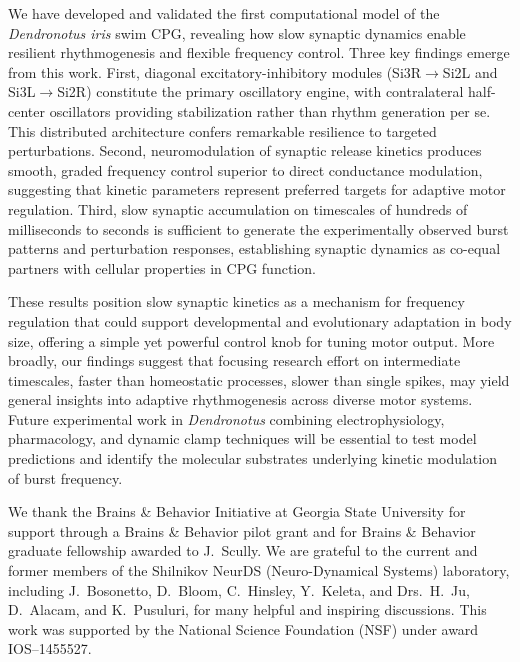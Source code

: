 \documentclass[nofootinbib,aip,amsmath,amssymb,preprint,twocolumn,floatfix,10pt]{revtex4-2}
\begin{document}
We have developed and validated the first computational model of the \textit{Dendronotus iris} swim CPG, revealing how slow synaptic dynamics enable resilient rhythmogenesis and flexible frequency control. Three key findings emerge from this work. First, diagonal excitatory-inhibitory modules (Si3R$\to$Si2L and Si3L$\to$Si2R) constitute the primary oscillatory engine, with contralateral half-center oscillators providing stabilization rather than rhythm generation per se. This distributed architecture confers remarkable resilience to targeted perturbations. Second, neuromodulation of synaptic release kinetics produces smooth, graded frequency control superior to direct conductance modulation, suggesting that kinetic parameters represent preferred targets for adaptive motor regulation. Third, slow synaptic accumulation on timescales of hundreds of milliseconds to seconds is sufficient to generate the experimentally observed burst patterns and perturbation responses, establishing synaptic dynamics as co-equal partners with cellular properties in CPG function.

These results position slow synaptic kinetics as a mechanism for frequency regulation that could support developmental and evolutionary adaptation in body size, offering a simple yet powerful control knob for tuning motor output. More broadly, our findings suggest that focusing research effort on intermediate timescales, faster than homeostatic processes, slower than single spikes, may yield general insights into adaptive rhythmogenesis across diverse motor systems. Future experimental work in \textit{Dendronotus} combining electrophysiology, pharmacology, and dynamic clamp techniques will be essential to test model predictions and identify the molecular substrates underlying kinetic modulation of burst frequency.

\begin{acknowledgments}
We thank the Brains \& Behavior Initiative at Georgia State University for support through a Brains \& Behavior pilot grant and for Brains \& Behavior graduate fellowship awarded to J.~Scully. We are grateful to the current and former members of the Shilnikov NeurDS (Neuro-Dynamical Systems) laboratory, including J.~Bosonetto, D.~Bloom, C.~Hinsley, Y.~Keleta, and Drs.~H.~Ju, D.~Alacam, and K.~Pusuluri, for many helpful and inspiring discussions. This work was supported by the National Science Foundation (NSF) under award  IOS--1455527.
\end{acknowledgments}

\label{fig:supp} 
\end{document}

